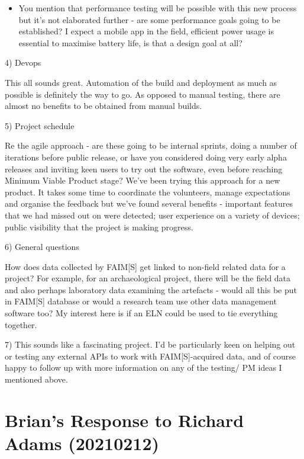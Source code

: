 \documentclass[a4paper,headings=small fontsize=10pt]{scrreprt}
\begin{document}
\begin{itemize}
\item You mention that performance testing will be possible with this new
  process but it's not elaborated further - are some performance goals
  going to be established? I expect a mobile app in the field, efficient
  power usage is essential to maximise battery life, is that a design
  goal at all?
 
\end{itemize}

4) Devops

This all sounds great. Automation of the build and deployment as much as
possible is definitely the way to go. As opposed to manual testing,
there are almost no benefits to be obtained from manual builds.

5) Project schedule

Re the agile approach - are these going to be internal sprints, doing a
number of iterations before public release, or have you considered doing
very early alpha releases and inviting keen users to try out the
software, even before reaching Minimum Viable Product stage? We've been
trying this approach for a new product. It takes some time to coordinate
the volunteers, manage expectations and organise the feedback but we've
found several benefits - important features that we had missed out on
were detected; user experience on a variety of devices; public
visibility that the project is making progress.

6) General questions

How does data collected by FAIM{[}S{]} get linked to non-field related
data for a project? For example, for an archaeological project, there
will be the field data and also perhaps laboratory data examining the
artefacts - would all this be put in FAIM{[}S{]} database or would a
research team use other data management software too? My interest here
is if an ELN could be used to tie everything together.

7) This sounds like a fascinating project. I'd be particularly keen on
helping out or testing any external APIs to work with
FAIM{[}S{]}-acquired data, and of course happy to follow up with more
information on any of the testing/ PM ideas I mentioned above.

\section{Brian's Response to Richard Adams
(20210212)}
\end{document}
